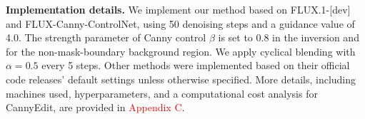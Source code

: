 \documentclass{article}
\begin{document}
\textbf{Implementation details.} We implement our method based on FLUX.1-[dev]\cite{blackforest2024FLUX} and FLUX-Canny-ControlNet\cite{xlabsai2025fluxcontrolnet}, using 50 denoising steps and a guidance value of 4.0. The strength parameter of Canny control $\beta$ is set to 0.8 in the inversion and for the non-mask-boundary background region. We apply cyclical blending with $\alpha=0.5$ every 5 steps. Other methods were implemented based on their official code releases' default settings unless otherwise specified. More details, including machines used, hyperparameters, and a computational cost analysis for CannyEdit, are provided in \textcolor{red}{Appendix C}.

\end{document}
